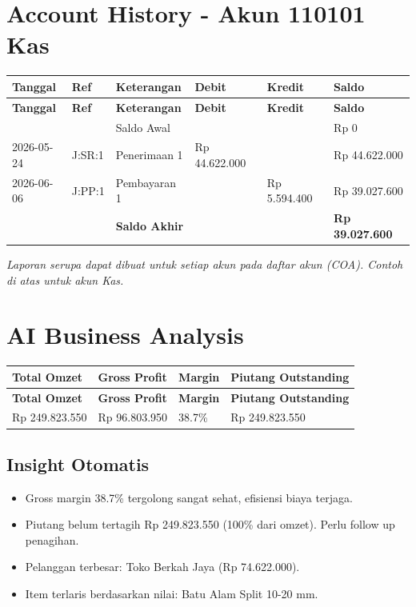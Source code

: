 \documentclass[11pt,a4paper]{article}
\begin{document}
\section{Account History - Akun 110101 Kas}
{\setlength{\tabcolsep}{5pt}\small
\begin{longtable}{l p{3cm} p{3.4cm} R{2.4cm} R{2.4cm} R{2.6cm}}
\toprule
\textbf{Tanggal} & \textbf{Ref} & \textbf{Keterangan} & \textbf{Debit} & \textbf{Kredit} & \textbf{Saldo} \\
\midrule\endfirsthead
\toprule
\textbf{Tanggal} & \textbf{Ref} & \textbf{Keterangan} & \textbf{Debit} & \textbf{Kredit} & \textbf{Saldo} \\
\midrule\endhead
\bottomrule\endfoot
 &  & Saldo Awal &  &  & Rp 0 \\
2026-05-24 & J:SR:1 & Penerimaan 1 & Rp 44.622.000 &  & Rp 44.622.000 \\
2026-06-06 & J:PP:1 & Pembayaran 1 &  & Rp 5.594.400 & Rp 39.027.600 \\
 &  & \textbf{Saldo Akhir} &  &  & \textbf{Rp 39.027.600} \\
\end{longtable}}

\textit{\small Laporan serupa dapat dibuat untuk setiap akun pada daftar akun (COA). Contoh di atas untuk akun Kas.}

\section{AI Business Analysis}
{\setlength{\tabcolsep}{5pt}
\begin{longtable}{l l l l}
\toprule
\textbf{Total Omzet} & \textbf{Gross Profit} & \textbf{Margin} & \textbf{Piutang Outstanding} \\
\midrule\endfirsthead
\toprule
\textbf{Total Omzet} & \textbf{Gross Profit} & \textbf{Margin} & \textbf{Piutang Outstanding} \\
\midrule\endhead
\bottomrule\endfoot
Rp 249.823.550 & Rp 96.803.950 & 38.7\% & Rp 249.823.550 \\
\end{longtable}}

\subsection{Insight Otomatis}
\begin{itemize}\setlength{\itemsep}{2pt}
\item Gross margin 38.7\% tergolong sangat sehat, efisiensi biaya terjaga.
\item Piutang belum tertagih Rp 249.823.550 (100\% dari omzet). Perlu follow up penagihan.
\item Pelanggan terbesar: Toko Berkah Jaya (Rp 74.622.000).
\item Item terlaris berdasarkan nilai: Batu Alam Split 10-20 mm.
\end{itemize}
\end{document}

